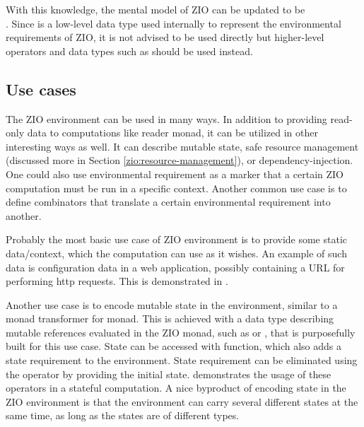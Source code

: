 

With this knowledge, the mental model of ZIO can be updated to be \\. Since  is a low-level data type used internally to represent the environmental requirements of ZIO, it is not advised to be used directly but higher-level operators and data types such as   should be used instead.


\subsection{Use cases}
The ZIO environment can be used in many ways. In addition to providing read-only data to computations like reader monad, it can be utilized in other interesting ways as well. It can describe mutable state, safe resource management (discussed more in Section \ref{zio:resource-management}), or dependency-injection. One could also use environmental requirement as a marker that a certain ZIO computation must be run in a specific context. Another common use case is to define combinators that translate a certain environmental requirement into another.

Probably the most basic use case of ZIO environment is to provide some static data/context, which the computation can use as it wishes. An example of such data is configuration data in a web application, possibly containing a URL for performing http requests. This is demonstrated in .



Another use case is to encode mutable state in the environment, similar to a monad transformer for  monad. This is achieved with a data type describing mutable references evaluated in the ZIO monad, such as  or , that is purposefully built for this use case. State can be accessed with  function, which also adds a state requirement to the environment. State requirement can be eliminated using the  operator by providing the initial state.  demonstrates the usage of these operators in a stateful computation. A nice byproduct of encoding state in the ZIO environment is that the environment can carry several different states at the same time, as long as the states are of different types.

